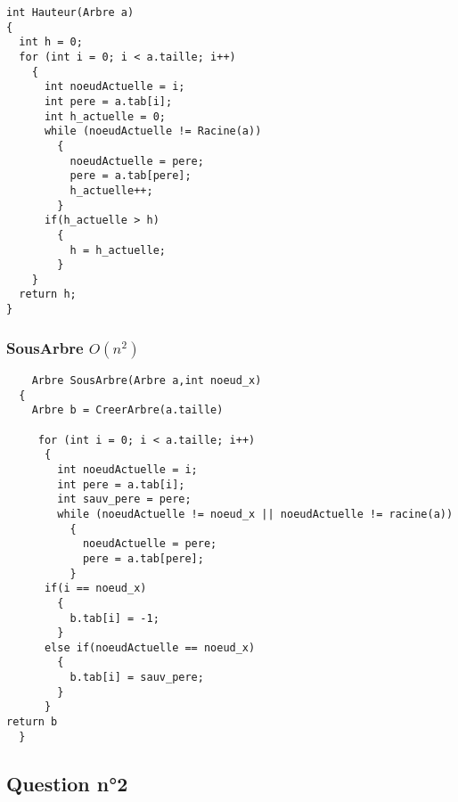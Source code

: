 \documentclass[11pt]{article}
\begin{document}
\begin{lstlisting}
int Hauteur(Arbre a)
{
  int h = 0;
  for (int i = 0; i < a.taille; i++)
    {
      int noeudActuelle = i;
      int pere = a.tab[i];
      int h_actuelle = 0;
      while (noeudActuelle != Racine(a))
        {
          noeudActuelle = pere;
          pere = a.tab[pere];
          h_actuelle++;
        }
      if(h_actuelle > h)
        {
          h = h_actuelle;
        }
    }
  return h;
}  
\end{lstlisting}

\subsubsection{SousArbre \(O(n^2)\)}
\label{sec:org41543bc}

\begin{lstlisting}
    Arbre SousArbre(Arbre a,int noeud_x)
  {
    Arbre b = CreerArbre(a.taille)

     for (int i = 0; i < a.taille; i++)
      {
        int noeudActuelle = i;
        int pere = a.tab[i];
        int sauv_pere = pere;
        while (noeudActuelle != noeud_x || noeudActuelle != racine(a))
          {
            noeudActuelle = pere;
            pere = a.tab[pere];
          }
      if(i == noeud_x)
        {
          b.tab[i] = -1;
        }
      else if(noeudActuelle == noeud_x)
        {
          b.tab[i] = sauv_pere;
        }
      }
return b
  }
\end{lstlisting}

\subsection{Question n°2}
\label{sec:orge270f56}
\end{document}
